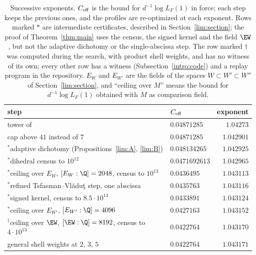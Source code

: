 \begin{table}[htbp]
\centering\small
\caption{Successive exponents. $C_{\rm eff}$ is the bound for
$d^{-1}\log L_F(1)$ in force; each step keeps the previous ones, and the
profiles are re-optimized at each exponent. Rows marked $*$ are intermediate
certificates, described in Section~\ref{lim:section}; the proof of
Theorem~\ref{thm:main} uses the census, the signed kernel and the field
$\EW$, but not the adaptive dichotomy or the single-abscissa step. The row
marked $\dagger$ was computed during the search, with product shell weights,
and has no witness of its own; every other row has a witness
(Subsection~\ref{intro:code}) and a replay program in the repository.
$E_W$ and $E_{W'}$ are the fields of the spaces $W\subset W'\subset W''$ of
Section~\ref{lim:section}, and ``ceiling over $M$'' means the bound for
$d^{-1}\log L_F(1)$ obtained with $M$ as comparison field.}
\label{intro:table-steps}
\begin{tabular}{@{}p{8.6cm}lr@{}}
\toprule
step & $C_{\rm eff}$ & exponent\\
\midrule
tower of \cite{Naslund04273} & $0.04871285$ & $1.04273$\\
cap above $41$ instead of $7$ & $0.04871285$ & $1.042901$\\
${}^*$adaptive dichotomy (Propositions~\ref{lim:A}, \ref{lim:B}) & $0.048134265$ & $1.042925$\\
${}^*$dihedral census to $10^{12}$ & $0.0471692613$ & $1.042965$\\
${}^*$ceiling over $E_W$, $[E_W:\Q]=2048$, census to $10^{13}$ & $0.0436495$ & $1.043113$\\
${}^*$refined Tsfasman--Vl\u{a}du\c{t} step, one abscissa & $0.0435763$ & $1.043116$\\
${}^*$signed kernel, census to $8.5\cdot10^{14}$ & $0.0433891$ & $1.043124$\\
${}^*$ceiling over $E_{W'}$, $[E_{W'}:\Q]=4096$ & $0.0427163$ & $1.043152$\\
${}^\dagger$ceiling over $\EW$, $[\EW:\Q]=8192$, census to $4\cdot10^{13}$ & $0.0422764$ & $1.043170$\\
general shell weights at $2$, $3$, $5$ & $0.0422764$ & $1.043171$\\
\bottomrule
\end{tabular}
\end{table}

